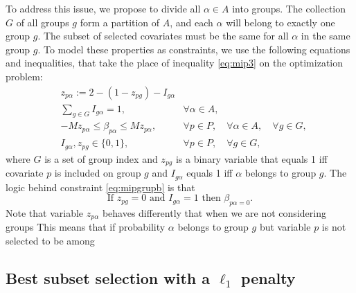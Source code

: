 To address this issue, we propose to divide all $\alpha \in A$ into groups. The collection $G$ of all groups $g$ form a partition of $A$, and each $\alpha$ will belong to exactly one group $g$. 
The subset of selected covariates must be the same for all $\alpha$ in the same group $g$. To model these properties as constraints, we use the following equations and inequalities, that take the place of inequality \ref{eq:mip3} on the optimization problem:
\begin{eqnarray}
&z_{p \alpha} := 2 - ( 1-z_{pg}) - I_{g\alpha}& \\
& \sum\limits_{g \in G} I_{g\alpha} = 1, & \forall \alpha \in A,\label{eq:mipgrupa} \\
& -Mz_{p \alpha}  \leq  \beta_{p \alpha} \leq M z_{p \alpha}, & \forall p \in P, \quad \forall \alpha \in A, \quad \forall g \in G, \label{eq:mipgrupb} \\
& I_{g\alpha}, z_{pg} \in \{0,1\},& \forall p \in P, \quad \forall g \in G, 
\end{eqnarray}
where $G$ is a set of group index and $z_{pg}$ is a binary variable that equals 1 iff covariate $p$ is included on group $g$ and $I_{g\alpha}$ equals 1 iff $\alpha$ belongs to group $g$.
The logic behind constraint \ref{eq:mipgrupb} is that 
$$\text{If }z_{pg} = 0 \text{ and }I_{g\alpha} =1 \text{ then } \beta_{p \alpha = 0}. $$
Note that variable $z_{p \alpha}$ behaves differently that when we are not considering groups
This means that if probability $\alpha$ belongs to group $g$ but variable $p$ is not selected to be among


\subsection{Best subset selection with a $\ell_1$ penalty}
\label{sec:best-subset-ell1}


